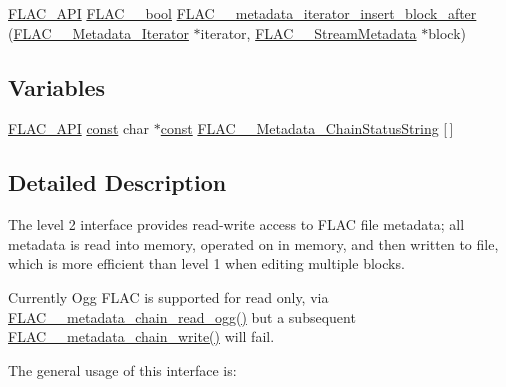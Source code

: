 \begin{DoxyCompactItemize}
\item 
\hyperlink{group__flac__export_ga56ca07df8a23310707732b1c0007d6f5}{F\+L\+A\+C\+\_\+\+A\+PI} \hyperlink{ordinals_8h_a95103469f1cbd78b8cf250194985b34e}{F\+L\+A\+C\+\_\+\+\_\+bool} \hyperlink{group__flac__metadata__level2_ga2f9d8e02bd2e5ffb235af0b02d347d47}{F\+L\+A\+C\+\_\+\+\_\+metadata\+\_\+iterator\+\_\+insert\+\_\+block\+\_\+after} (\hyperlink{group__flac__metadata__level2_ga9f3e135a07cdef7e51597646aa7b89b2}{F\+L\+A\+C\+\_\+\+\_\+\+Metadata\+\_\+\+Iterator} $\ast$iterator, \hyperlink{struct_f_l_a_c_____stream_metadata}{F\+L\+A\+C\+\_\+\+\_\+\+Stream\+Metadata} $\ast$block)
\end{DoxyCompactItemize}
\subsection*{Variables}
\begin{DoxyCompactItemize}
\item 
\hyperlink{group__flac__export_ga56ca07df8a23310707732b1c0007d6f5}{F\+L\+A\+C\+\_\+\+A\+PI} \hyperlink{zconf_8h_a2c212835823e3c54a8ab6d95c652660e}{const} char $\ast$\hyperlink{zconf_8h_a2c212835823e3c54a8ab6d95c652660e}{const} \hyperlink{group__flac__metadata__level2_gabb4646b4af36d17497676759767f8cc7}{F\+L\+A\+C\+\_\+\+\_\+\+Metadata\+\_\+\+Chain\+Status\+String} \mbox{[}$\,$\mbox{]}
\end{DoxyCompactItemize}


\subsection{Detailed Description}
The level 2 interface provides read-\/write access to F\+L\+AC file metadata; all metadata is read into memory, operated on in memory, and then written to file, which is more efficient than level 1 when editing multiple blocks. 

Currently Ogg F\+L\+AC is supported for read only, via \hyperlink{group__flac__metadata__level2_gae7b34f2929bedea0e14ac14aca253a40}{F\+L\+A\+C\+\_\+\+\_\+metadata\+\_\+chain\+\_\+read\+\_\+ogg()} but a subsequent \hyperlink{group__flac__metadata__level2_gaa15ead7230217de8e79f4af822cda490}{F\+L\+A\+C\+\_\+\+\_\+metadata\+\_\+chain\+\_\+write()} will fail.

The general usage of this interface is\+:


